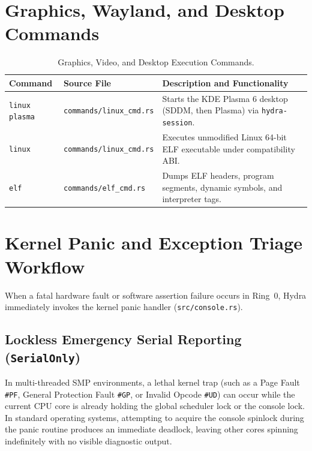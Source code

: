 \section{Graphics, Wayland, and Desktop Commands}
\label{sec:shell_desktop_cmds}

\begin{table}[htbp]
\centering
\small
\begin{tabularx}{\textwidth}{llX}
\toprule
\textbf{Command} & \textbf{Source File} & \textbf{Description and Functionality} \\
\midrule
\texttt{linux plasma} & \texttt{commands/linux\_cmd.rs} & Starts the KDE Plasma 6 desktop (SDDM, then Plasma) via \texttt{hydra-session}. \\
\texttt{linux} & \texttt{commands/linux\_cmd.rs} & Executes unmodified Linux 64-bit ELF executable under compatibility ABI. \\
\texttt{elf} & \texttt{commands/elf\_cmd.rs} & Dumps ELF headers, program segments, dynamic symbols, and interpreter tags. \\
\bottomrule
\end{tabularx}
\caption{Graphics, Video, and Desktop Execution Commands.}
\label{tab:shell_desktop_cmds}
\end{table}

\section{Kernel Panic and Exception Triage Workflow}
\label{sec:kernel_panic_triage}

When a fatal hardware fault or software assertion failure occurs in Ring~0, Hydra immediately invokes the kernel panic handler (\texttt{src/console.rs}). 

\subsection{Lockless Emergency Serial Reporting (\texttt{SerialOnly})}
In multi-threaded SMP environments, a lethal kernel trap (such as a Page Fault \texttt{\#PF}, General Protection Fault \texttt{\#GP}, or Invalid Opcode \texttt{\#UD}) can occur while the current CPU core is already holding the global scheduler lock or the console lock. In standard operating systems, attempting to acquire the console spinlock during the panic routine produces an immediate deadlock, leaving other cores spinning indefinitely with no visible diagnostic output.

